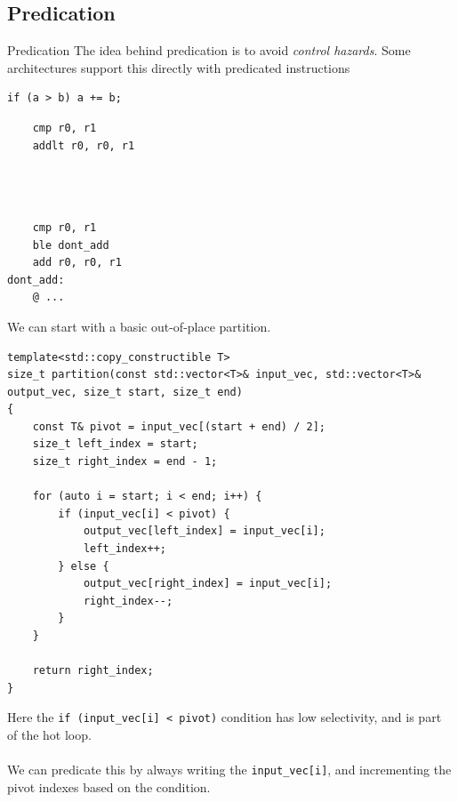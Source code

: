 \subsection{Predication}
\begin{sidenotebox}{Predication}
    The idea behind predication is to avoid \textit{control hazards}.
    Some architectures support this directly with predicated instructions
    \\ \begin{minipage}[t]{.3\textwidth}
        \begin{verbatim}
if (a > b) a += b;
        \end{verbatim}
    \end{minipage} \hfill \begin{minipage}[t]{.2\textwidth}
        \begin{verbatim}
    cmp r0, r1
    addlt r0, r0, r1


    
        \end{verbatim}
    \end{minipage} \hfill\begin{minipage}[t]{.2\textwidth}
        \begin{verbatim}
    cmp r0, r1
    ble dont_add 
    add r0, r0, r1
dont_add:
    @ ...
        \end{verbatim}
    \end{minipage}
\end{sidenotebox}
We can start with a basic out-of-place partition.
\begin{verbatim}
template<std::copy_constructible T>
size_t partition(const std::vector<T>& input_vec, std::vector<T>& output_vec, size_t start, size_t end)
{
    const T& pivot = input_vec[(start + end) / 2];  
    size_t left_index = start;
    size_t right_index = end - 1;

    for (auto i = start; i < end; i++) {
        if (input_vec[i] < pivot) {
            output_vec[left_index] = input_vec[i];
            left_index++;
        } else {
            output_vec[right_index] = input_vec[i];
            right_index--;
        }
    }

    return right_index;
}
\end{verbatim}
Here the \texttt{if (input_vec[i] < pivot)} condition has low selectivity, and is part of the hot loop.
\\
\\ We can predicate this by always writing the \texttt{input_vec[i]}, and incrementing the pivot indexes based on the condition.
